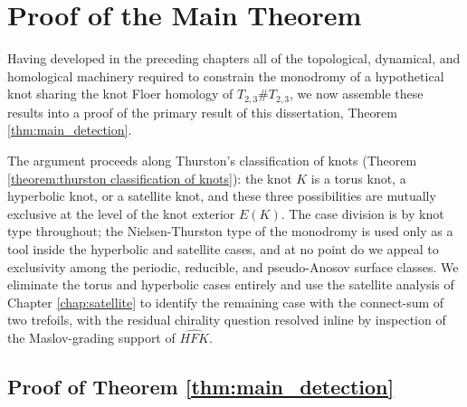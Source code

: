 \chapter{Proof of the Main Theorem}\label{chap:proof_of_main_theorem}

Having developed in the preceding chapters all of the topological, dynamical, and homological machinery required to constrain the monodromy of a hypothetical knot sharing the knot Floer homology of $T_{2,3}\# T_{2,3}$, we now assemble these results into a proof of the primary result of this dissertation, Theorem \ref{thm:main_detection}.

The argument proceeds along Thurston's classification of knots (Theorem \ref{theorem:thurston classification of knots}): the knot $K$ is a torus knot, a hyperbolic knot, or a satellite knot, and these three possibilities are mutually exclusive at the level of the knot exterior $E(K)$. The case division is by knot type throughout; the Nielsen-Thurston type of the monodromy is used only as a tool inside the hyperbolic and satellite cases, and at no point do we appeal to exclusivity among the periodic, reducible, and pseudo-Anosov surface classes. We eliminate the torus and hyperbolic cases entirely and use the satellite analysis of Chapter \ref{chap:satellite} to identify the remaining case with the connect-sum of two trefoils, with the residual chirality question resolved inline by inspection of the Maslov-grading support of $\widehat{HFK}$.

\section{Proof of Theorem \ref{thm:main_detection}}
\label{sec:proof_main_detection}

